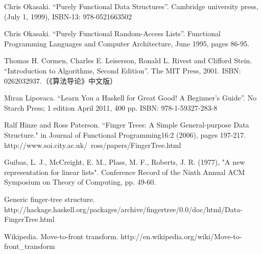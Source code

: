 \documentclass[UTF8]{article}
\begin{document}
\begin{thebibliography}{99}

Chris Okasaki. ``Purely Functional Data Structures''. Cambridge university press, (July 1, 1999), ISBN-13: 978-0521663502

Chris Okasaki. ``Purely Functional Random-Access Lists''. Functional Programming Languages and Computer Architecture, June 1995, pages 86-95.

Thomas H. Cormen, Charles E. Leiserson, Ronald L. Rivest and Clifford Stein. ``Introduction to Algorithms, Second Edition''. The MIT Press, 2001. ISBN: 0262032937.（《算法导论》中文版）

Miran Lipovaca. ``Learn You a Haskell for Great Good! A Beginner's Guide''. No Starch Press; 1 edition April 2011, 400 pp. ISBN: 978-1-59327-283-8

Ralf Hinze and Ross Paterson. ``Finger Trees: A Simple General-purpose Data Structure." in Journal of Functional Programming16:2 (2006), pages 197-217. http://www.soi.city.ac.uk/~ross/papers/FingerTree.html

Guibas, L. J., McCreight, E. M., Plass, M. F., Roberts, J. R. (1977), "A new representation for linear lists". Conference Record of the Ninth Annual ACM Symposium on Theory of Computing, pp. 49-60.

Generic finger-tree structure. http://hackage.haskell.org/packages/archive/fingertree/0.0/doc/html/Data-FingerTree.html

Wikipedia. Move-to-front transform. http://en.wikipedia.org/wiki/Move-to-front\_transform

\end{thebibliography}
\end{document}
